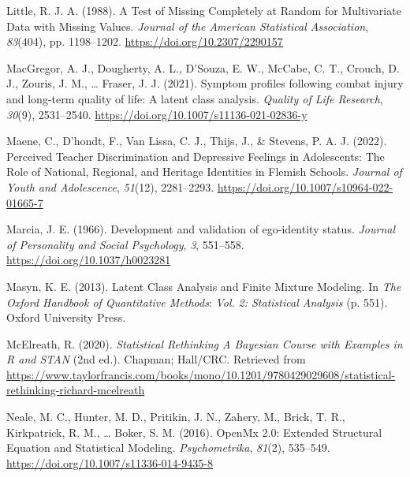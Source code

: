 \documentclass[
  ,man,floatsintext]{apa6}
\newlength{\cslhangindent}
\newlength{\cslentryspacingunit} %
\newenvironment{CSLReferences}[2] %
 {%
  \setlength{\parindent}{0pt}
  \ifodd #1
  \let\oldpar\par
  \def\par{\hangindent=\cslhangindent\oldpar}
  \fi
  \setlength{\parskip}{#2\cslentryspacingunit}
 }%
 {}
\begin{document}
\begin{CSLReferences}{1}{0}
\leavevmode{}%
Little, R. J. A. (1988). A {Test} of {Missing} {Completely} at {Random} for {Multivariate} {Data} with {Missing} {Values}. \emph{Journal of the American Statistical Association}, \emph{83}(404), pp. 1198--1202. \url{https://doi.org/10.2307/2290157}

\leavevmode{}%
MacGregor, A. J., Dougherty, A. L., D'Souza, E. W., McCabe, C. T., Crouch, D. J., Zouris, J. M., \ldots{} Fraser, J. J. (2021). Symptom profiles following combat injury and long-term quality of life: A latent class analysis. \emph{Quality of Life Research}, \emph{30}(9), 2531--2540. \url{https://doi.org/10.1007/s11136-021-02836-y}

\leavevmode{}%
Maene, C., D'hondt, F., Van Lissa, C. J., Thijs, J., \& Stevens, P. A. J. (2022). Perceived {Teacher} {Discrimination} and {Depressive} {Feelings} in {Adolescents}: {The} {Role} of {National}, {Regional}, and {Heritage} {Identities} in {Flemish} {Schools}. \emph{Journal of Youth and Adolescence}, \emph{51}(12), 2281--2293. \url{https://doi.org/10.1007/s10964-022-01665-7}

\leavevmode{}%
Marcia, J. E. (1966). Development and validation of ego-identity status. \emph{Journal of Personality and Social Psychology}, \emph{3}, 551--558. \url{https://doi.org/10.1037/h0023281}

\leavevmode{}%
Masyn, K. E. (2013). Latent {Class} {Analysis} and {Finite} {Mixture} {Modeling}. In \emph{The {Oxford} {Handbook} of {Quantitative} {Methods}}: \emph{Vol.} \emph{2: Statistical Analysis} (p. 551). Oxford University Press.

\leavevmode{}%
McElreath, R. (2020). \emph{Statistical {Rethinking} {\textbar} {A} {Bayesian} {Course} with {Examples} in {R} and {STAN}} (2nd ed.). Chapman; Hall/CRC. Retrieved from \url{https://www.taylorfrancis.com/books/mono/10.1201/9780429029608/statistical-rethinking-richard-mcelreath}

\leavevmode{}%
Neale, M. C., Hunter, M. D., Pritikin, J. N., Zahery, M., Brick, T. R., Kirkpatrick, R. M., \ldots{} Boker, S. M. (2016). {OpenMx} 2.0: {Extended} {Structural} {Equation} and {Statistical} {Modeling}. \emph{Psychometrika}, \emph{81}(2), 535--549. \url{https://doi.org/10.1007/s11336-014-9435-8}


\end{CSLReferences}
\end{document}
